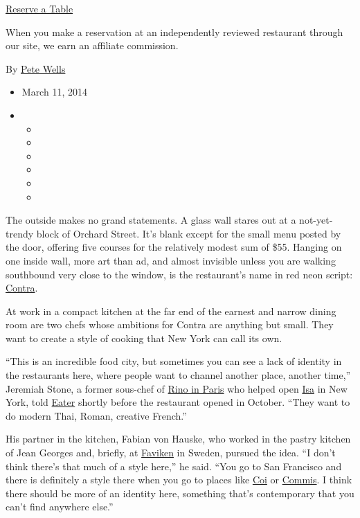 \href{https://reserve.com/r/contra}{Reserve a Table}

When you make a reservation at an independently reviewed restaurant
through our site, we earn an affiliate commission.

By \href{http://www.nytimes3xbfgragh.onion/by/pete-wells}{Pete Wells}

\begin{itemize}
\item
  March 11, 2014
\item
  \begin{itemize}
  \item
  \item
  \item
  \item
  \item
  \item
  \end{itemize}
\end{itemize}

The outside makes no grand statements. A glass wall stares out at a
not-yet-trendy block of Orchard Street. It's blank except for the small
menu posted by the door, offering five courses for the relatively modest
sum of \$55. Hanging on one inside wall, more art than ad, and almost
invisible unless you are walking southbound very close to the window, is
the restaurant's name in red neon script:
\href{http://contranyc.com/}{Contra}.

At work in a compact kitchen at the far end of the earnest and narrow
dining room are two chefs whose ambitions for Contra are anything but
small. They want to create a style of cooking that New York can call its
own.

``This is an incredible food city, but sometimes you can see a lack of
identity in the restaurants here, where people want to channel another
place, another time,'' Jeremiah Stone, a former sous-chef of
\href{http://www.nytimes3xbfgragh.onion/2010/10/31/travel/31rino-paris-bites.html}{Rino
in Paris} who helped open
\href{http://www.nytimes3xbfgragh.onion/2011/11/23/dining/reviews/isa-nyc-restaurant-review.html}{Isa}
in New York, told
\href{http://ny.eater.com/archives/2013/08/contra_interview.php}{Eater}
shortly before the restaurant opened in October. ``They want to do
modern Thai, Roman, creative French.''

His partner in the kitchen, Fabian von Hauske, who worked in the pastry
kitchen of Jean Georges and, briefly, at
\href{http://www.phaidon.com/store/food-cook/faviken-9780714864709/}{Faviken}
in Sweden, pursued the idea. ``I don't think there's that much of a
style here,'' he said. ``You go to San Francisco and there is definitely
a style there when you go to places like
\href{http://www.nytimes3xbfgragh.onion/2008/03/05/dining/05seven.html?ref=dining\&action=click\&module=Search\&region=searchResults\%230\&version=\&url=http\%3A\%2F\%2Fquery.nytimes3xbfgragh.onion\%2Fsearch\%2Fsitesearch\%2F\%23\%2Fcoi\%2Bwells\%2F}{Coi}
or \href{http://www.commisrestaurant.com/}{Commis}. I think there should
be more of an identity here, something that's contemporary that you
can't find anywhere else.''


